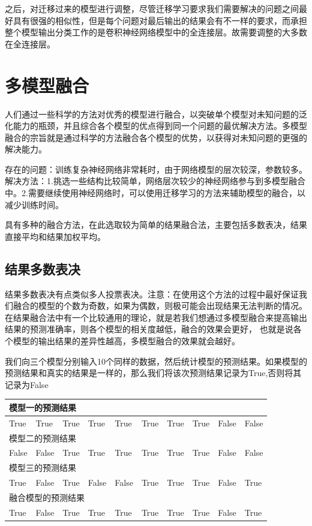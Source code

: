 \documentclass[openbib]{article}
\begin{document}
之后，对迁移过来的模型进行调整，尽管迁移学习要求我们需要解决的问题之间最好具有很强的相似性，但是每个问题对最后输出的结果会有不一样的要求，而承担整个模型输出分类工作的是卷积神经网络模型中的全连接层。故需要调整的大多数在全连接层。
\section{多模型融合}
人们通过一些科学的方法对优秀的模型进行融合，以突破单个模型对未知问题的泛化能力的瓶颈，并且综合各个模型的优点得到同一个问题的最优解决方法。多模型融合的宗旨就是通过科学的方法融合各个模型的优势，以获得对未知问题的更强的解决能力。

存在的问题：训练复杂神经网络非常耗时，由于网络模型的层次较深，参数较多。解决方法：1.挑选一些结构比较简单，网络层次较少的神经网络参与到多模型融合中。2.需要继续使用神经网络时，可以使用迁移学习的方法来辅助模型的融合，以减少训练时间。

具有多种的融合方法，在此选取较为简单的结果融合法，主要包括多数表决，结果直接平均和结果加权平均。

\subsection{结果多数表决}
结果多数表决有点类似多人投票表决。注意：在使用这个方法的过程中最好保证我们融合的模型的个数为奇数，如果为偶数，则极可能会出现结果无法判断的情况。在结果融合法中有一个比较通用的理论，就是若我们想通过多模型融合来提高输出结果的预测准确率，则各个模型的相关度越低，融合的效果会更好， 也就是说各个模型的输出结果的差异性越高，多模型融合的效果就会越好。

我们向三个模型分别输入10个同样的数据，然后统计模型的预测结果。如果模型的预测结果和真实的结果是一样的，那么我们将该次预测结果记录为True,否则将其记录为False
\begin{table}[htbp]
	\begin{tabular}{|l|l|l|l|l|l|l|l|l|l|}
		\hline
		\multicolumn{10}{|l|}{模型一的预测结果}                                             \\ \hline
		True  & True  & True & True  & True  & True & True & True & False & False \\ \hline
		\multicolumn{10}{|l|}{模型二的预测结果}                                             \\ \hline
		False & False & True & True  & True  & True & True & True & False & False \\ \hline
		\multicolumn{10}{|l|}{模型三的预测结果}                                             \\ \hline
		True  & False & True & False & False & True & True & True & False & True  \\ \hline
		\multicolumn{10}{|l|}{融合模型的预测结果}                                            \\ \hline
		True  & False & True & True  & True  & True & True & True & False & True  \\ \hline
	\end{tabular}
\end{table}
\end{document}
